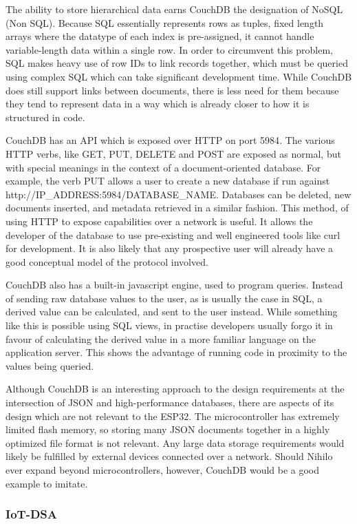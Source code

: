 \documentclass{article}
\begin{document}
The ability to store hierarchical data earns CouchDB the designation of NoSQL (Non SQL). Because SQL essentially represents rows as tuples, fixed length arrays where the datatype of each index is pre-assigned, it cannot handle variable-length data within a single row. In order to circumvent this problem, SQL makes heavy use of row IDs to link records together, which must be queried using complex SQL which can take significant development time. While CouchDB does still support links between documents, there is less need for them because they tend to represent data in a way which is already closer to how it is structured in code.

CouchDB has an API which is exposed over HTTP on port 5984\cite{couch}. The various HTTP verbs, like GET, PUT, DELETE and POST are exposed as normal, but with special meanings in the context of a document-oriented database. For example, the verb PUT allows a user to create a new database if run against http://IP\_ADDRESS:5984/DATABASE\_NAME. Databases can be deleted, new documents inserted, and metadata retrieved in a similar fashion. This method, of using HTTP to expose capabilities over a network is useful. It allows the developer of the database to use pre-existing and well engineered tools like curl for development. It is also likely that any prospective user will already have a good conceptual model of the protocol involved.

CouchDB also has a built-in javascript engine, used to program queries. Instead of sending raw database values to the user, as is usually the case in SQL, a derived value can be calculated, and sent to the user instead. While something like this is possible using SQL views, in practise developers usually forgo it in favour of calculating the derived value in a more familiar language on the application server. This shows the advantage of running code in proximity to the values being queried.

Although CouchDB is an interesting approach to the design requirements at the intersection of JSON and high-performance databases, there are aspects of its design which are not relevant to the ESP32. The microcontroller has extremely limited flash memory, so storing many JSON documents together in a highly optimized file format is not relevant. Any large data storage requirements would likely be fulfilled by external devices connected over a network. Should Nihilo ever expand beyond microcontrollers, however, CouchDB would be a good example to imitate.

\subsubsection{IoT-DSA}
\end{document}
